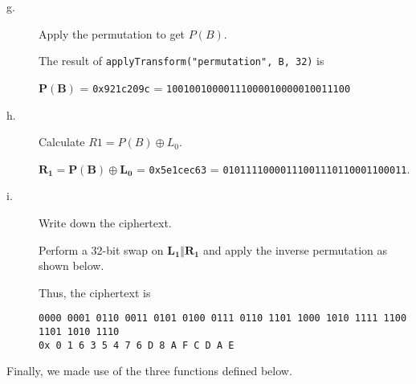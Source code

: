 \documentclass[../hw_sols.tex]{subfiles}
\begin{document}
\begin{description}
\begin{solution}
\end{solution}


\item[g.] Apply the permutation to get $P(B)$.

\begin{solution}
The result of \verb|applyTransform("permutation", B, 32)| is
\begin{center}
	$\mathbf{P(B)}$ 
	= \verb|0x921c209c|
	= \verb|10010010000111000010000010011100|
\end{center}
\end{solution}


\item[h.] Calculate $R1 = P(B) \oplus L_0$.

\begin{solution}
$\mathbf{R_1} 
= \mathbf{P(B)} \oplus \mathbf{L_0}$
= \verb|0x5e1cec63|
= \verb|01011110000111001110110001100011|.
\end{solution}


\newpage


\item[i.] Write down the ciphertext.

\begin{solution}
Perform a 32-bit swap on $\mathbf{L_1 \Vert R_1}$ and apply the inverse permutation as shown below.



Thus, the ciphertext is
\begin{center}
	\verb|0000 0001 0110 0011 0101 0100 0111 0110 1101 1000 1010 1111 1100 1101 1010 1110| \\
	\verb|0x 0 1 6 3 5 4 7 6 D 8 A F C D A E|
\end{center}
\end{solution}

\end{description}


\vspace{0.5cm}


\begin{solution}
Finally, we made use of the three functions defined below.


\end{solution}
\end{document}
